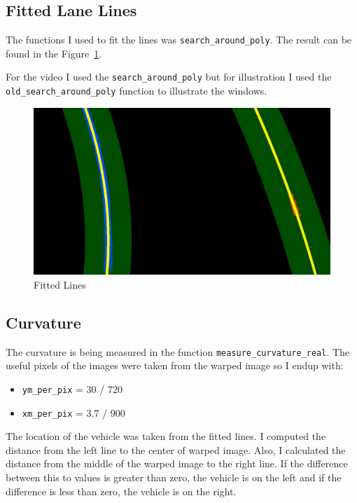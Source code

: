 \documentclass[11pt, a4paper]{article}
\begin{document}
\subsection{Fitted Lane Lines}%
\label{sub:fitted_lane_lines}

The functions I used to fit the lines was \texttt{search\_around\_poly}. The result can be found in the Figure~\ref{fig:fitted_lines}.


For the video I used the \texttt{search\_around\_poly} but for illustration I used the \texttt{old\_search\_around\_poly} function to illustrate the windows. 

\begin{figure}[htb!]
	\centering
	\includegraphics[width=0.8\linewidth]{fitted_lines}
	\caption{Fitted Lines}
	\label{fig:fitted_lines}
\end{figure}

\subsection{Curvature}%
\label{sub:curvature}

The curvature is being measured in the function \texttt{measure\_curvature\_real}. The useful pixels of the images were taken from the warped image so I endup with:

\begin{itemize}
	\item \texttt{ym\_per\_pix} = 30 / 720
	\item \texttt{xm\_per\_pix} = 3.7 / 900
\end{itemize}

The location of the vehicle was taken from the fitted lines. I computed the distance from the left line to the center of warped image. Also, I calculated the distance from the middle of the warped image to the right line. If the difference between this to values is greater than zero, the vehicle is on the left and if the difference is less than zero, the vehicle is on the right.
\end{document}
